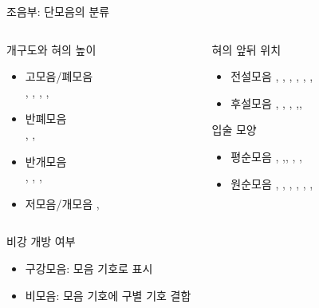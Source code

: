 \documentclass[11pt, aspectratio=169]{beamer}
\newcommand{\textds}[1]{{\ipafont #1}}
\begin{document}
\begin{frame}[t]{조음부: 단모음의 분류}
    \begin{columns}
        \begin{column}[T]{0.36\textwidth}
            \begin{block}{개구도와 혀의 높이}
                \begin{itemize}
                    \item 고모음/폐모음 \\ \textds{[i]}, \textds{[y]}, \textds{[ɨ]}, \textds{[ʉ]} \textds{[ɯ]}, \textds{[u]}
                    \item 반폐모음 \\ \textds{[e]}, \textds{[ø]}, \textds{[o]}
                    \item 반개모음 \\ \textds{[ɛ]}, \textds{[œ]}, \textds{[ʌ]},\textds{[ɔ]}
                    \item 저모음/개모음 \textds{[a]}, \textds{[ɒ]}
                \end{itemize}
            \end{block}
        \end{column}
        \begin{column}[T]{0.57\textwidth}
            \begin{block}{혀의 앞뒤 위치}
                \begin{itemize}
                    \item 전설모음 \textds{[i]}, \textds{[y]}, \textds{[e]}, \textds{[ø]}, \textds{[ɛ]}, \textds{[œ]}, \textds{[a]}
                    \item 후설모음 \textds{[ɯ]}, \textds{[u]}, \textds{[o]}, \textds{[ʌ]},\textds{[ɔ]}, \textds{[ɒ]}
                \end{itemize}
            \end{block}
            \begin{block}{입술 모양}
                \begin{itemize}
                    \item 평순모음 \textds{[i]}, \textds{[e]},\textds{[ɛ]}, \textds{[a]}, \textds{[ɯ]}, \textds{[ʌ]}
                    \item 원순모음 \textds{[y]}, \textds{[ø]}, \textds{[œ]}, \textds{[u]}, \textds{[o]}, \textds{[ɔ]}, \textds{[ɒ]}
                \end{itemize}
            \end{block}
        \end{column}
    \end{columns}
    \begin{block}{비강 개방 여부}
        \begin{itemize}
            \item 구강모음: 모음 기호로 표시
            \item 비모음: 모음 기호에 \textds{[ ̃]} 구별 기호 결합
        \end{itemize}                
    \end{block}
\end{frame}
\end{document}
